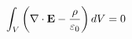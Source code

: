 \documentclass[preview]{standalone}
\begin{document}
\begin{align*}
\special{dvisvgm:raw <g id='unique000'>}\int_V\left(\nabla\cdot\mathbf E-\frac{\rho}{\varepsilon_0}\right)dV=0\special{dvisvgm:raw </g>}
\end{align*}
\end{document}
